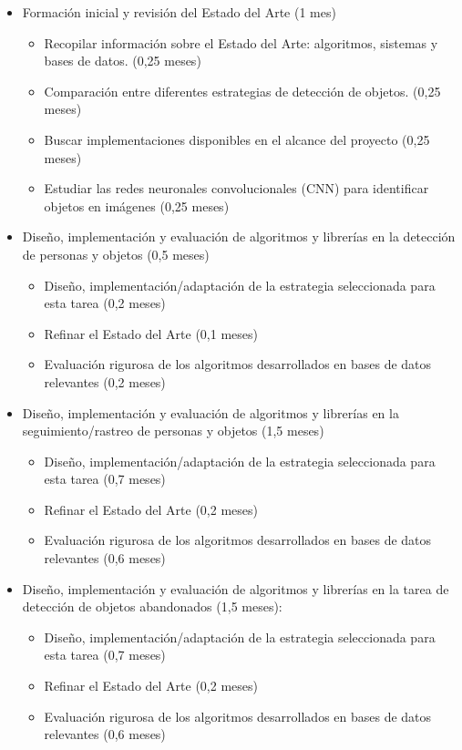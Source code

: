 \begin{itemize}
\item Formación inicial y revisión del Estado del Arte (1 mes)
  
  \begin{itemize}
    \item Recopilar información sobre el Estado del Arte: algoritmos, sistemas y bases de datos. (0,25 meses)
    \item Comparación entre diferentes estrategias de detección de objetos. (0,25 meses)
    \item Buscar implementaciones disponibles en el alcance del proyecto (0,25 meses)
    \item Estudiar las redes neuronales convolucionales (CNN) para identificar objetos en imágenes (0,25 meses)
  \end{itemize}
  
\item Diseño, implementación y evaluación de algoritmos y librerías en la detección de personas y objetos (0,5 meses)
  
  \begin{itemize}
  \item Diseño, implementación/adaptación de la estrategia seleccionada para esta tarea (0,2 meses)
  \item Refinar el Estado del Arte (0,1 meses)
  \item Evaluación rigurosa de los algoritmos desarrollados en bases de datos relevantes (0,2 meses)
  \end{itemize}
  
\item Diseño, implementación y evaluación de algoritmos y librerías en la seguimiento/rastreo de personas y objetos (1,5 meses)
  
  \begin{itemize}
  \item Diseño, implementación/adaptación de la estrategia seleccionada para esta tarea (0,7 meses)
  \item Refinar el Estado del Arte (0,2 meses)
  \item Evaluación rigurosa de los algoritmos desarrollados en bases de datos relevantes (0,6 meses)
  \end{itemize}

\item Diseño, implementación y evaluación de algoritmos y librerías en la tarea de detección de objetos abandonados (1,5 meses):
  
  \begin{itemize}
  \item Diseño, implementación/adaptación de la estrategia seleccionada para esta tarea (0,7 meses)
  \item Refinar el Estado del Arte (0,2 meses)
  \item Evaluación rigurosa de los algoritmos desarrollados en bases de datos relevantes (0,6 meses)
    \end{itemize}
    

\end{itemize}
